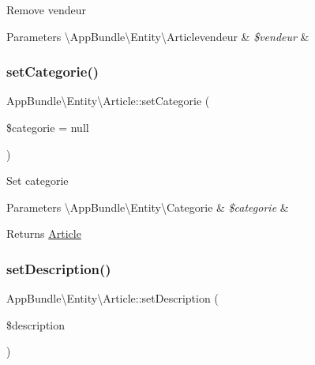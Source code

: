 Remove vendeur


\begin{DoxyParams}[1]{Parameters}
\textbackslash{}\+App\+Bundle\textbackslash{}\+Entity\textbackslash{}\+Articlevendeur & {\em \$vendeur} & \\
\hline
\end{DoxyParams}
\mbox{\label{class_app_bundle_1_1_entity_1_1_article_a849b7ee1604e5923b13ba0d3d3d9fa48}} 
\subsubsection{\texorpdfstring{set\+Categorie()}{setCategorie()}}
{\footnotesize\ttfamily App\+Bundle\textbackslash{}\+Entity\textbackslash{}\+Article\+::set\+Categorie (\begin{DoxyParamCaption}\item[{\textbackslash{}\hyperlink{class_app_bundle_1_1_entity_1_1_categorie}{App\+Bundle\textbackslash{}\+Entity\textbackslash{}\+Categorie}}]{\$categorie = {\ttfamily null} }\end{DoxyParamCaption})}

Set categorie


\begin{DoxyParams}[1]{Parameters}
\textbackslash{}\+App\+Bundle\textbackslash{}\+Entity\textbackslash{}\+Categorie & {\em \$categorie} & \\
\hline
\end{DoxyParams}
\begin{DoxyReturn}{Returns}
\hyperlink{class_app_bundle_1_1_entity_1_1_article}{Article} 
\end{DoxyReturn}
\mbox{\label{class_app_bundle_1_1_entity_1_1_article_a2e1cff9c966b564aba6ea7bec4ea4757}} 
\subsubsection{\texorpdfstring{set\+Description()}{setDescription()}}
{\footnotesize\ttfamily App\+Bundle\textbackslash{}\+Entity\textbackslash{}\+Article\+::set\+Description (\begin{DoxyParamCaption}\item[{}]{\$description }\end{DoxyParamCaption})}

